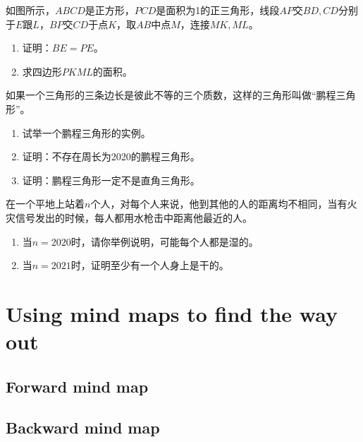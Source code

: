 \begin{question}
  如图所示，$ABCD$是正方形，$PCD$是面积为1的正三角形，线段$AP$交$BD, CD$分别于$E$跟$L$，$BP$交$CD$于点$K$，取$AB$中点$M$，连接$MK,ML$。
  \begin{enumerate}
  \item 证明：$BE=PE$。
  \item 求四边形$PKML$的面积。
  \end{enumerate}

  \begin{center}
  \end{center}
\end{question}


\begin{question}
  如果一个三角形的三条边长是彼此不等的三个质数，这样的三角形叫做“鹏程三角形”。
  \begin{enumerate}
  \item 试举一个鹏程三角形的实例。
  \item 证明：不存在周长为2020的鹏程三角形。
  \item 证明：鹏程三角形一定不是直角三角形。
  \end{enumerate}
\end{question}


\begin{question}
  在一个平地上站着$n$个人，对每个人来说，他到其他的人的距离均不相同，当有火灾信号发出的时候，每人都用水枪击中距离他最近的人。
  \begin{enumerate}
  \item 当$n=2020$时，请你举例说明，可能每个人都是湿的。
  \item 当$n=2021$时，证明至少有一个人身上是干的。
  \end{enumerate}
\end{question}






\section{Using mind maps to find the way out}
\label{sec:mind-map}

\subsection{Forward mind map}
\label{sec:mind-map-forward}

\subsection{Backward mind map}
\label{sec:mind-map-backward}




